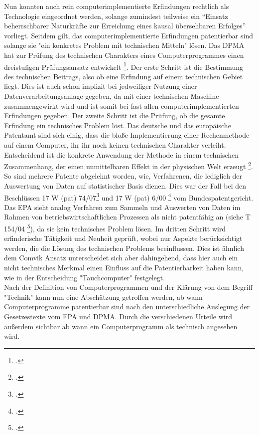 Nun konnten auch rein computerimplementierte Erfindungen 
rechtlich als Technologie eingeordnet werden, solange 
zumindest teilweise ein 
“Einsatz beherrschbarer Naturkräfte zur Erreichung eines kausal übersehbaren Erfolges”
vorliegt. Seitdem gilt,
das computerimplementierte Erfindungen patentierbar sind
solange sie "ein konkretes Problem mit technischen Mitteln" lösen.
Das DPMA hat zur Prüfung des technischen Charakters eines 
Computerprogrammes einen dreistufigen Prüfungsansatz entwickelt \footcite{DPMAPatentschutz}.
Der erste Schritt ist die Bestimmung des technischen Beitrags,
also ob eine Erfindung auf einem technischen Gebiet liegt. 
Dies ist auch schon implizit bei jedweiliger Nutzung einer Datenverarbeitungsanlage
gegeben, da mit einer technischen Maschine zusammengewirkt wird
und ist somit bei fast allen computerimplementierten Erfindungen gegeben.
Der zweite Schritt ist die Prüfung, ob die gesamte Erfindung ein technisches Problem löst.
Das deutsche und das europäische Patentamt sind sich einig,
dass die bloße Implementierung 
einer Rechenmethode auf einem Computer, ihr
ihr noch keinen technischen Charakter verleiht. 
Entscheidend ist die konkrete Anwendung der Methode 
in einem technischen Zusammenhang, der einen unmittelbaren Effekt in der 
physischen Welt erzeugt \footcite{melullisEPUArt522023}.
So sind mehrere Patente abgelehnt worden,
wie, Verfahrenen, 
die lediglich der Auswertung von Daten auf statistischer Basis dienen.
Dies war der Fall bei den Beschlüssen 17 W (pat) 74/07\footcite{BPatG10012012}
und 17 W (pat) 6/00 \footcite{BPatG01032001} vom Bundespatentgericht.
Das EPA sieht analog Verfahren zum Sammeln und Auswerten von Daten 
im Rahmen von betriebswirtschaftlichen Prozessen als nicht patentfähig an 
(siehe T 154/04 \footcite{EuropaischesPatentamt152006}),
da sie kein technisches Problem lösen.
Im dritten Schritt wird erfinderische Tätigkeit und Neuheit 
geprüft, wobei nur Aspekte berücksichtigt werden,
die die Lösung des technischen Problems beeinflussen.
Dies ist ähnlich dem Comvik Ansatz unterscheidet sich
aber dahingehend, dass hier auch ein nicht technisches
Merkmal einen Einfluss auf die Patentierbarkeit haben kann,
wie in der Entscheidung "Tauchcomputer" festgelegt.
\\
Nach der Definition von Computerprogrammen und der Klärung von dem Begriff
"Technik" kann nun eine Abschätzung getroffen werden, 
ab wann Computerprogramme patentierbar sind nach den
unterschiedliche Auslegung der Gesetzestexte vom EPA und DPMA. 
Durch die verschiedenen Urteile wird außerdem sichtbar 
ab wann ein Computerprogramm als technisch angesehen wird.
